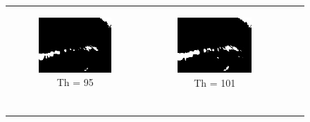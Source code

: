 \begin{figure}[htbp]
\begin{tabular}{cccc}
\begin{subfigure}{0.2\linewidth}
    \includegraphics[width=\linewidth]{plots/thresholding/th6}
    \caption{Th = 95}
    \end{subfigure} &
    \begin{subfigure}{0.2\linewidth}
    \centering
    \includegraphics[width=\linewidth]{plots/thresholding/th7}
    \caption{Th = 101}
    \end{subfigure} \\
    \begin{subfigure}{0.2\linewidth}
    \centering

\end{subfigure}
\end{tabular}
\end{figure}
